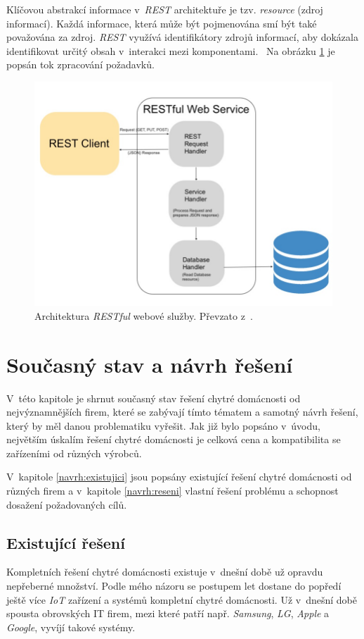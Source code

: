 Klíčovou abstrakcí informace v~\emph{REST} architektuře je tzv. \emph{resource} (zdroj informací).
Každá informace, která může být pojmenována smí být také považována za zdroj.
\emph{REST} využívá identifikátory zdrojů informací, aby dokázala identifikovat určitý obsah v~interakci mezi komponentami.~\cite{restful:info}
Na obrázku \ref{figure:restful} je popsán tok zpracování požadavků.

\begin{figure}[ht]
  \centering
  \includegraphics[width=.59 \linewidth]{obrazky-figures/restful.jpg}
  \caption{Architektura \emph{RESTful} webové služby. Převzato z~\cite{restful:example}.}
  \label{figure:restful}
\end{figure}

\chapter{Současný stav a návrh řešení}
\label{navrh}

V~této kapitole je shrnut současný stav řešení chytré domácnosti od nejvýznamnějších firem, které se zabývají tímto tématem a samotný návrh řešení, který by měl danou problematiku vyřešit.
Jak již bylo popsáno v~úvodu, největším úskalím řešení chytré domácnosti je celková cena a kompatibilita se zařízeními od různých výrobců.

V~kapitole \ref{navrh:existujici} jsou popsány existující řešení chytré domácnosti od různých firem a v~kapitole \ref{navrh:reseni} vlastní řešení problému a schopnost dosažení požadovaných cílů.

\section*{Existující řešení}
\label{navrh:existujici}

Kompletních řešení chytré domácnosti existuje v~dnešní době už opravdu nepřeberné množství. Podle mého názoru se postupem let dostane do popředí ještě více \emph{IoT} zařízení a systémů kompletní chytré domácnosti.
Už v~dnešní době spousta obrovských IT firem, mezi které patří např. \emph{Samsung}, \emph{LG}, \emph{Apple} a \emph{Google}, vyvíjí takové systémy.

